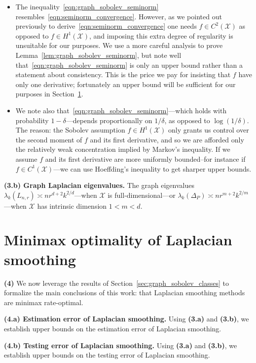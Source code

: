 \documentclass{article}
\newcommand{\1}{\mathbf{1}}
\newcommand{\Lap}{L}
\newcommand{\Xset}{\mathcal{X}}
\theoremstyle{alden}
\theoremstyle{aldenthm}
\theoremstyle{definition}
\theoremstyle{remark}
\begin{document}
\begin{itemize}
	\item 
	The inequality~\eqref{eqn:graph_sobolev_seminorm} resembles~\eqref{eqn:seminorm_convergence}. However, as we pointed out previously to derive~\eqref{eqn:seminorm_convergence} one needs $f \in C^{2}(\Xset)$ as opposed to $f \in H^1(\Xset)$, and imposing this extra degree of regularity is unsuitable for our purposes. We use a more careful analysis to prove Lemma~\eqref{lem:graph_sobolev_seminorm}, but note well that~\eqref{eqn:graph_sobolev_seminorm} is only an upper bound rather than a statement about consistency. This is the price we pay for insisting that $f$ have only one derivative; fortunately an upper bound will be sufficient for our purposes in Section~\ref{sec:minimax_optimal_laplacian_smoothing}.
	\item We note also that~\eqref{eqn:graph_sobolev_seminorm}---which holds with probability $1 - \delta$---depends proportionally on $1/\delta$, as opposed to $\log(1/\delta)$. The reason: the Sobolev assumption $f \in H^1(\Xset)$ only grants us control over the second moment of $f$ and its first derivative, and so we are afforded only the relatively weak concentration implied by Markov's inequality. If we assume $f$ and its first derivative are more uniformly bounded--for instance if $f \in C^1(\Xset)$---we can use Hoeffding's inequality to get sharper upper bounds.
\end{itemize}
 
\textbf{(3.b) Graph Laplacian eigenvalues.} The graph eigenvalues $\lambda_k(\Lap_{n,r}) \asymp n r^{d + 2}k^{2/d}$---when $\Xset$ is full-dimensional---or $\lambda_k(\Delta_P) \asymp nr^{m + 2}k^{2/m}$---when $\Xset$ has intrinsic dimension $1 < m < d$. 

\section{Minimax optimality of Laplacian smoothing}
\label{sec:minimax_optimal_laplacian_smoothing}

\textbf{(4)} We now leverage the results of Section~\ref{sec:graph_sobolev_classes} to formalize the main conclusions of this work: that Laplacian smoothing methods are minimax rate-optimal.

\textbf{(4.a) Estimation error of Laplacian smoothing.} Using \textbf{(3.a)} and \textbf{(3.b)}, we establish upper bounds on the estimation error of Laplacian smoothing.

\textbf{(4.b) Testing error of Laplacian smoothing.} Using \textbf{(3.a)} and \textbf{(3.b)}, we establish upper bounds on the testing error of Laplacian smoothing.
\end{document}
